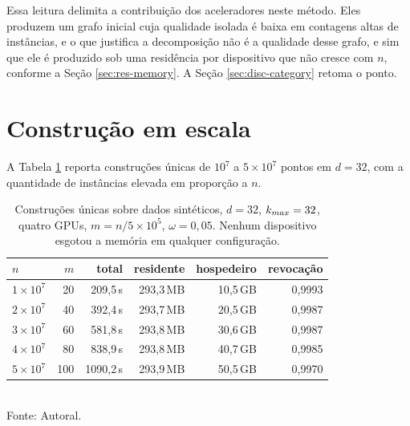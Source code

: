 Essa leitura delimita a contribuição dos aceleradores neste método. Eles produzem um grafo inicial cuja qualidade isolada é baixa em contagens altas de instâncias, e o que justifica a decomposição não é a qualidade desse grafo, e sim que ele é produzido sob uma residência por dispositivo que não cresce com $n$, conforme a Seção \ref{sec:res-memory}. A Seção \ref{sec:disc-category} retoma o ponto.\\

\section{Construção em escala\label{sec:res-scale}}

A Tabela \ref{tab:scale} reporta construções únicas de $10^7$ a $5 \times 10^7$ pontos em $d = 32$, com a quantidade de instâncias elevada em proporção a $n$.\\

\begin{table}[htb!]
\caption{\label{tab:scale} Construções únicas sobre dados sintéticos, $d = 32$, $k_{max} = 32$, quatro \ac{GPU}s, $m = n / 5 \times 10^5$, $\omega = 0{,}05$. Nenhum dispositivo esgotou a memória em qualquer configuração.}
\centering
\footnotesize
\begin{tabular}{@{}lrrrrr@{}}
\toprule
$n$ & $m$ & total & residente & hospedeiro & revocação \\
\midrule
$1\times10^7$ & 20  & 209,5\,s  & 293,3\,MB & 10,5\,GB & 0,9993 \\
$2\times10^7$ & 40  & 392,4\,s  & 293,7\,MB & 20,5\,GB & 0,9987 \\
$3\times10^7$ & 60  & 581,8\,s  & 293,8\,MB & 30,6\,GB & 0,9987 \\
$4\times10^7$ & 80  & 838,9\,s  & 293,8\,MB & 40,7\,GB & 0,9985 \\
$5\times10^7$ & 100 & 1090,2\,s & 293,9\,MB & 50,5\,GB & 0,9970 \\
\bottomrule
\end{tabular}\\
Fonte: Autoral.
\end{table}

